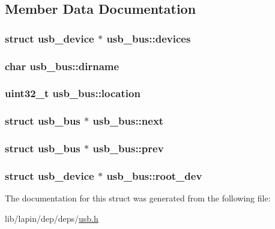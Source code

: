 \subsection{Member Data Documentation}
\hypertarget{structusb__bus_ac36d0add02d389f3ae15e5cade08b4b4}{
\subsubsection[{devices}]{\setlength{\rightskip}{0pt plus 5cm}struct {\bf usb\-\_\-device} $\ast$ usb\-\_\-bus\-::devices}}\label{structusb__bus_ac36d0add02d389f3ae15e5cade08b4b4}
\hypertarget{structusb__bus_ae8b9f78fe9afce6fa6d682f85f3980f8}{
\subsubsection[{dirname}]{\setlength{\rightskip}{0pt plus 5cm}char usb\-\_\-bus\-::dirname}}\label{structusb__bus_ae8b9f78fe9afce6fa6d682f85f3980f8}
\hypertarget{structusb__bus_ac15a6a9382eeb4a552abb3931cf88170}{
\subsubsection[{location}]{\setlength{\rightskip}{0pt plus 5cm}uint32\-\_\-t usb\-\_\-bus\-::location}}\label{structusb__bus_ac15a6a9382eeb4a552abb3931cf88170}
\hypertarget{structusb__bus_a688dc9ee89ff98b6ec86813efee8fa85}{
\subsubsection[{next}]{\setlength{\rightskip}{0pt plus 5cm}struct {\bf usb\-\_\-bus} $\ast$ usb\-\_\-bus\-::next}}\label{structusb__bus_a688dc9ee89ff98b6ec86813efee8fa85}
\hypertarget{structusb__bus_a02d6ed8e783c4f40cf990196595be62a}{
\subsubsection[{prev}]{\setlength{\rightskip}{0pt plus 5cm}struct {\bf usb\-\_\-bus} $\ast$ usb\-\_\-bus\-::prev}}\label{structusb__bus_a02d6ed8e783c4f40cf990196595be62a}
\hypertarget{structusb__bus_ac7723cca14365fb0955e8f13fb4fdb55}{
\subsubsection[{root\-\_\-dev}]{\setlength{\rightskip}{0pt plus 5cm}struct {\bf usb\-\_\-device} $\ast$ usb\-\_\-bus\-::root\-\_\-dev}}\label{structusb__bus_ac7723cca14365fb0955e8f13fb4fdb55}


The documentation for this struct was generated from the following file\-:\begin{DoxyCompactItemize}
\item 
lib/lapin/dep/deps/\hyperlink{deps_2usb_8h}{usb.\-h}\end{DoxyCompactItemize}
